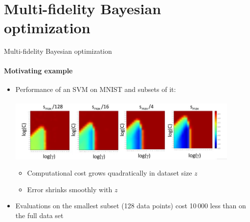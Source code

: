 \section{Multi-fidelity Bayesian optimization}
\begin{frame}[c]{Multi-fidelity Bayesian optimization}
\framesubtitle{Motivating example}

\begin{itemize}
    \item Performance of an SVM on MNIST and subsets of it:\\~\\
	    \includegraphics[width=0.9\textwidth]{w07_hpo_grey_box/images/fabolas/example_mnist.jpg}
	    \begin{itemize}
            \item Computational cost grows quadratically in dataset size $z$
            \item Error shrinks smoothly with $z$
        \end{itemize}
	\item Evaluations on the smallest subset (128 data points) cost 10\,000 less than on the full data set
    
\end{itemize}
\end{frame}

